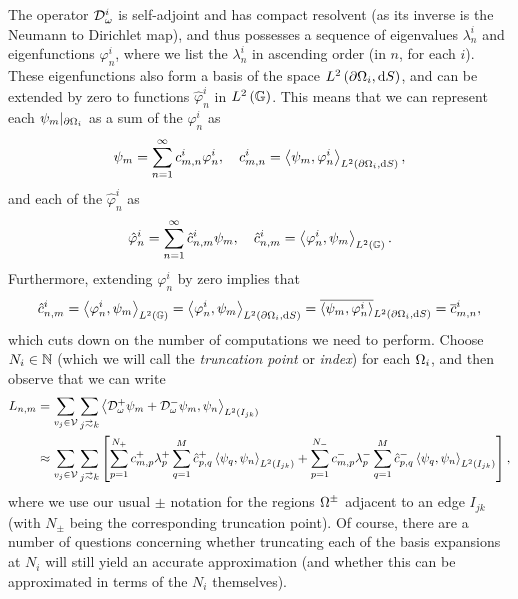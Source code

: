 The operator $\mathcal{D}_{\omega}^i$ is self-adjoint and has compact resolvent (as its inverse is the Neumann to Dirichlet map), and thus possesses a sequence of eigenvalues $\lambda^i_n$ and eigenfunctions $\varphi_n^i$, where we list the $\lambda^i_n$ in ascending order (in $n$, for each $i$).
These eigenfunctions also form a basis of the space $L^{2}\left( \partial\Omega_i,\mathrm{d} S \right)$, and can be extended by zero to functions $\hat{\varphi}_n^i$ in $L^2\left( \mathbb{G} \right)$.
This means that we can represent each $\psi_m\vert_{\partial\Omega_i}$ as a sum of the $\varphi_n^i$ as
\begin{align*}
	\psi_m = \sum_{n=1}^{\infty} c_{m,n}^i \varphi_n^i, \quad c_{m,n}^i = \left\langle \psi_m , \varphi_n^i \right\rangle_{L^{2}\left( \partial\Omega_i,\mathrm{d} S \right)},
\end{align*}
and each of the $\hat{\varphi}_n^i$ as
\begin{align*}
	\hat{\varphi}_n^i = \sum_{n=1}^{\infty} \hat{c}_{n,m}^i \psi_m, \quad \hat{c}_{n,m}^i = \left\langle \varphi_n^i , \psi_m \right\rangle_{L^2\left( \mathbb{G} \right)}.
\end{align*}
Furthermore, extending $\varphi_n^i$ by zero implies that
\begin{align*}
	\hat{c}_{n,m}^i = \left\langle \varphi_n^i , \psi_m \right\rangle_{L^2\left( \mathbb{G} \right)} = \left\langle \varphi_n^i , \psi_m \right\rangle_{L^{2}\left( \partial\Omega_i,\mathrm{d} S \right)} = \overline{\left\langle \psi_m , \varphi_n^i \right\rangle}_{L^{2}\left( \partial\Omega_i,\mathrm{d} S \right)} = \overline{c}_{m,n}^i,
\end{align*}
which cuts down on the number of computations we need to perform.
Choose $N_i\in\mathbb{N}$ (which we will call the \emph{truncation point} or \emph{index}) for each $\Omega_i$, and then observe that we can write
\begin{align*}
	L_{n,m} 
	&= \sum_{v_j\in\vertSet}\sum_{j\conLeft k} \ip{\dtn^+_{\omega}\psi_m + \dtn^-_{\omega}\psi_m}{\psi_n}_{L^2\bracs{I_{jk}}} \\
	&\approx \sum_{v_j\in\vertSet}\sum_{j\conLeft k}
	\sqbracs{ \sum_{p=1}^{N_+}c_{m,p}^+\lambda^+_p \sum_{q=1}^M \hat{c}_{p,q}^+ \ip{\psi_q}{\psi_n}_{L^2\bracs{I_{jk}}} + \sum_{p=1}^{N_-}c_{m,p}^-\lambda^-_p \sum_{q=1}^M \hat{c}_{p,q}^- \ip{\psi_q}{\psi_n}_{L^2\bracs{I_{jk}}} },
\end{align*}
where we use our usual $\pm$ notation for the regions $\Omega^{\pm}$ adjacent to an edge $I_{jk}$ (with $N_{\pm}$ being the corresponding truncation point).
Of course, there are a number of questions concerning whether truncating each of the basis expansions at $N_i$ will still yield an accurate approximation (and whether this can be approximated in terms of the $N_i$ themselves).

